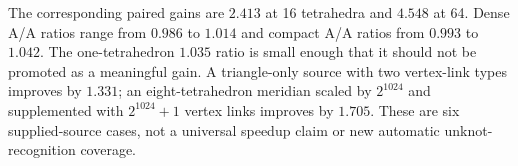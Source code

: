 The corresponding paired gains are $2.413$ at 16 tetrahedra and $4.548$ at
64. Dense A/A ratios range from $0.986$ to $1.014$ and compact A/A ratios
from $0.993$ to $1.042$. The one-tetrahedron $1.035$ ratio is small enough
that it should not be promoted as a meaningful gain. A triangle-only source
with two vertex-link types improves by $1.331$; an eight-tetrahedron meridian
scaled by $2^{1024}$ and supplemented with $2^{1024}+1$ vertex links improves
by $1.705$. These are six supplied-source cases, not a universal speedup
claim or new automatic unknot-recognition coverage.
